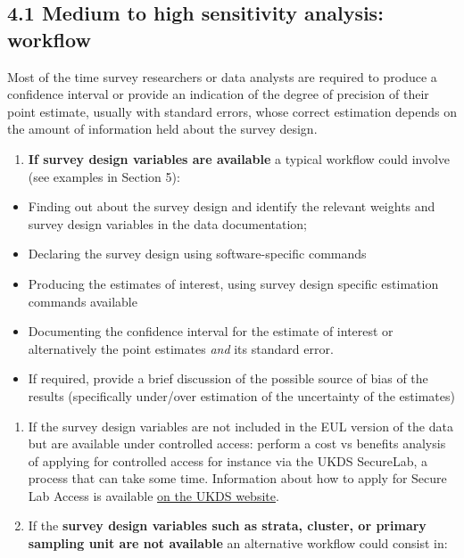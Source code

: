\documentclass[
  14,
  a4paper,
  DIV=11,
  numbers=noendperiod]{scrartcl}
\providecommand{\tightlist}{%
  \setlength{\itemsep}{0pt}\setlength{\parskip}{0pt}}\usepackage{longtable,booktabs,array}
\begin{document}
\hypertarget{medium-to-high-sensitivity-analysis-workflow}{%
\subsection{4.1 Medium to high sensitivity analysis:
workflow}\label{medium-to-high-sensitivity-analysis-workflow}}

Most of the time survey researchers or data analysts are required to
produce a confidence interval or provide an indication of the degree of
precision of their point estimate, usually with standard errors, whose
correct estimation depends on the amount of information held about the
survey design.

\begin{enumerate}
\def\labelenumi{\arabic{enumi}.}
\tightlist
\item
  \textbf{If survey design variables are available} a typical workflow
  could involve (see examples in Section 5):
\end{enumerate}

\begin{itemize}
\tightlist
\item
  Finding out about the survey design and identify the relevant weights
  and survey design variables in the data documentation;
\item
  Declaring the survey design using software-specific commands
\item
  Producing the estimates of interest, using survey design specific
  estimation commands available
\item
  Documenting the confidence interval for the estimate of interest or
  alternatively the point estimates \emph{and} its standard error.
\item
  If required, provide a brief discussion of the possible source of bias
  of the results (specifically under/over estimation of the uncertainty
  of the estimates)
\end{itemize}

\begin{enumerate}
\def\labelenumi{\arabic{enumi}.}
\setcounter{enumi}{1}
\item
  If the survey design variables are not included in the EUL version of
  the data but are available under controlled access: perform a cost vs
  benefits analysis of applying for controlled access for instance via
  the UKDS SecureLab, a process that can take some time. Information
  about how to apply for Secure Lab Access is available
  \href{https://ukdataservice.ac.uk/find-data/access-conditions/secure-application-requirements/apply-to-access-ons-data}{on
  the UKDS website}.
\item
  If the \textbf{survey design variables such as strata, cluster, or
  primary sampling unit are not available} an alternative workflow could
  consist in:
\end{enumerate}
\end{document}
